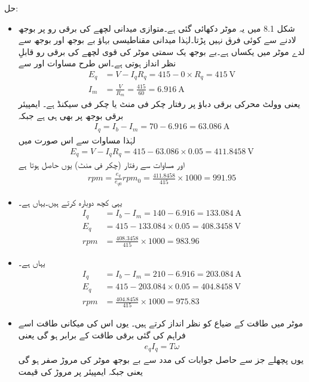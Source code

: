 حل:
\begin{itemize}
\item
شکل 8.1 میں یہ موٹر دکھائی گئی ہے۔متوازی میدانی لچھے کی برقی رو پر بوجھ لادنے سے کوئی فرق نہیں پڑتا۔لہٰذا میدانی مقناطیسی بہاؤ بے بوجھ اور بوجھ سے لدے موٹر میں یکساں ہے۔بے بوجھ یک سمتی موٹر کی قوی لچھے کی برقی رو   قابلِ نظر انداز ہوتی ہے۔اس طرح مساوات  اور  سے  
\begin{align*}
E_q&=V-I_q R_q=415-0\times R_q=\SI{415}{\volt}\\
I_m&=\frac{V}{R_m}=\frac{415}{60}=\SI{6.916}{\ampere}
\end{align*}
یعنی  وولٹ محرکی برقی دباؤ پر رفتار  چکر فی منٹ یا  چکر فی سیکنڈ ہے۔ ایمپیئر برقی بوجھ پر بھی  ہی ہے جبکہ 
\begin{align*}
I_q=I_b-I_m=70-6.916=\SI{63.086}{\ampere}
\end{align*}
لہٰذا مساوات  سے اس صورت میں
\begin{align*}
E_q=V-I_q R_q=415-63.086 \times 0.05=\SI{411.8458}{\volt}
\end{align*}
اور مساوات  سے رفتار (چکر فی منٹ) یوں حاصل ہوتا ہے
\begin{align*}
rpm=\frac{e_q}{e_{q0}} rpm_0=\frac{411.8458}{415} \times 1000=991.95
\end{align*}
%
\item
یہی کچھ دوبارہ کرتے ہیں۔یہاں  ہے۔
\begin{align*}
I_q&=I_b-I_m=140-6.916=\SI{133.084}{\ampere}\\
E_q&=415-133.084 \times 0.05=\SI{408.3458}{\volt}\\
rpm&=\frac{408.3458}{415} \times 1000=983.96
\end{align*}
%
\item
یہاں  ہے۔
\begin{align*}
I_q&=I_b-I_m=210-6.916=\SI{203.084}{\ampere}\\
E_q&=415-203.084 \times 0.05=\SI{404.8458}{\volt}\\
rpm&=\frac{404.8458}{415} \times 1000=975.83
\end{align*}
%
\item
موٹر میں طاقت کے ضیاع کو نظر انداز کرتے ہیں۔ یوں اس کی میکانی طاقت اسے فراہم کی گئی برقی طاقت کے برابر ہو گی یعنی
\begin{align}
e_q I_q=T \omega
\end{align}
یوں پچھلے جز سے حاصل جوابات کی مدد سے بے بوجھ موٹر کی مروڑ  صفر ہو گی یعنی   جبکہ   ایمپیئر پر مروڑ کی قیمت

\end{itemize}
